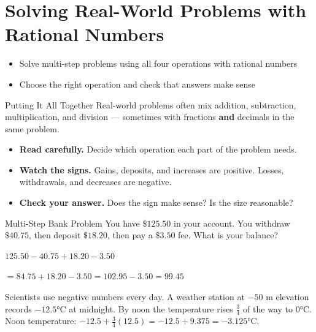 \section{Solving Real-World Problems with Rational Numbers}

\begin{learningGoals}
\begin{itemize}
    \item Solve multi-step problems using all four operations with rational numbers
    \item Choose the right operation and check that answers make sense
\end{itemize}
\end{learningGoals}

\begin{conceptBox}{Putting It All Together}
Real-world problems often mix addition, subtraction, multiplication, and division — sometimes with fractions \textbf{and} decimals in the same problem.
\begin{itemize}[leftmargin=*]
    \item \textbf{Read carefully.} Decide which operation each part of the problem needs.
    \item \textbf{Watch the signs.} Gains, deposits, and increases are positive. Losses, withdrawals, and decreases are negative.
    \item \textbf{Check your answer.} Does the sign make sense? Is the size reasonable?
\end{itemize}
\end{conceptBox}

\begin{workedExample}{Multi-Step Bank Problem}
You have $\$125.50$ in your account. You withdraw $\$40.75$, then deposit $\$18.20$, then pay a $\$3.50$ fee. What is your balance?

$125.50 - 40.75 + 18.20 - 3.50$

$= 84.75 + 18.20 - 3.50 = 102.95 - 3.50 = 99.45$
\end{workedExample}

\begin{realWorld}
Scientists use negative numbers every day. A weather station at $-50$ m elevation records $-12.5°$C at midnight. By noon the temperature rises $\frac{3}{4}$ of the way to $0°$C. Noon temperature: $-12.5 + \frac{3}{4}(12.5) = -12.5 + 9.375 = -3.125°$C.
\end{realWorld}

